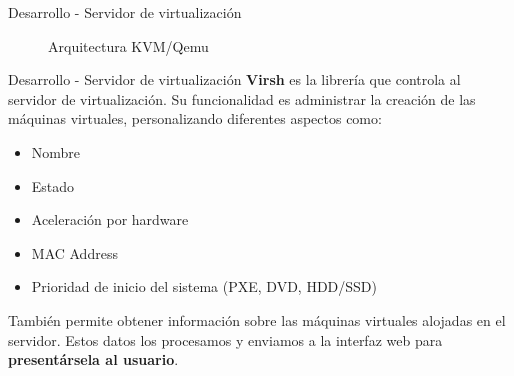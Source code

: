 \begin{frame}{Desarrollo - Servidor de virtualización}
\begin{figure}[!tbp]
\begin{minipage}[b]{0.4\textwidth}
        \caption{\scriptsize Arquitectura KVM/Qemu}
      \end{minipage}
    \end{figure}


\end{frame}


\begin{frame}{Desarrollo - Servidor de virtualización}
    \vspace{0cm}
    \textbf{Virsh} es la librería que controla al servidor de virtualización. Su funcionalidad es administrar la creación de las máquinas virtuales, personalizando diferentes aspectos como:
        \begin{itemize}
            \item Nombre
            \item Estado
            \item Aceleración por hardware
            \item MAC Address
            \item Prioridad de inicio del sistema (PXE, DVD, HDD/SSD)
        \end{itemize}
    También permite obtener información sobre las máquinas virtuales alojadas en el servidor. Estos datos los procesamos y enviamos a la interfaz web para \textbf{presentársela al usuario}.

\end{frame}


